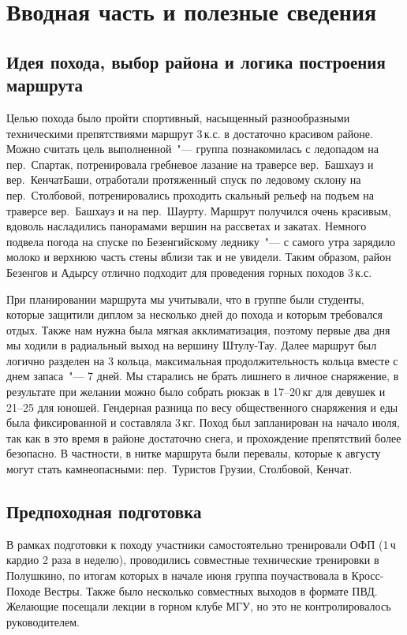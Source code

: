 \section{Вводная часть и полезные сведения}\label{sec:introduction}
	\subsection{Идея похода, выбор района и логика построения маршрута}
		Целью похода было пройти спортивный, насыщенный разнообразными техническими препятствиями маршрут 3\,к.с.
		в достаточно красивом районе. Можно считать цель выполненной~"--- группа познакомилась с ледопадом на
		пер.~Спартак, потренировала гребневое лазание на траверсе вер.~Башхауз и вер.~КенчатБаши, отработали протяженный
		спуск по ледовому склону на пер.~Столбовой, потренировались проходить скальный рельеф на подъем на траверсе
		вер.~Башхауз и на пер.~Шаурту. Маршрут получился очень красивым, вдоволь насладились панорамами вершин на
		рассветах и закатах. Немного подвела погода на спуске по Безенгийскому леднику~"--- с самого утра зарядило молоко
		и верхнюю часть стены вблизи так и не увидели. Таким образом, район Безенгов и Адырсу отлично подходит для
		проведения горных походов 3\,к.с. 
		
		При планировании маршрута мы учитывали, что в группе были студенты, которые защитили диплом за несколько дней
		до похода и которым требовался отдых. Также нам нужна была мягкая акклиматизация, поэтому первые два дня мы
		ходили в радиальный выход на вершину Штулу-Тау. Далее маршрут был логично разделен на 3 кольца, максимальная
		продолжительность кольца вместе с днем запаса~"--- 7 дней. Мы старались не брать лишнего в личное снаряжение,
		в результате при желании можно было собрать рюкзак в 17--20\,кг для девушек и 21--25 для юношей. Гендерная разница
		по весу общественного снаряжения и еды была фиксированной и составляла 3\,кг. Поход был запланирован на начало
		июля, так как в это время в районе достаточно снега, и прохождение препятствий более безопасно. В частности, в
		нитке маршрута были перевалы, которые к августу могут стать камнеопасными: пер.~Туристов Грузии, Столбовой, Кенчат.
	
	
	\subsection{Предпоходная подготовка}
		В рамках подготовки к походу участники самостоятельно тренировали ОФП (1\,ч кардио 2 раза в неделю), проводились
		совместные технические тренировки в Полушкино, по итогам которых в начале июня группа поучаствовала в Кросс-Походе
		Вестры. Также было несколько совместных выходов в формате ПВД. Желающие посещали лекции в горном клубе МГУ, но это
		не контролировалось руководителем.
	

